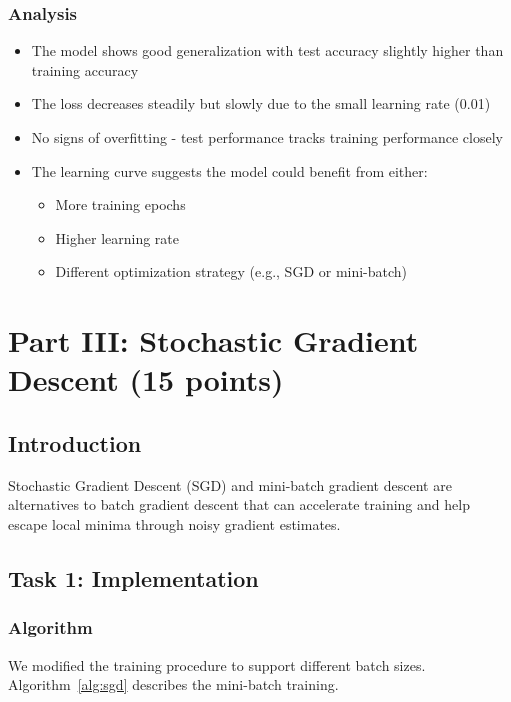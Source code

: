 \documentclass[11pt,a4paper]{article}
\begin{document}
\subsubsection{Analysis}
\begin{itemize}
    \item The model shows good generalization with test accuracy slightly higher than training accuracy
    \item The loss decreases steadily but slowly due to the small learning rate (0.01)
    \item No signs of overfitting - test performance tracks training performance closely
    \item The learning curve suggests the model could benefit from either:
    \begin{itemize}
        \item More training epochs
        \item Higher learning rate
        \item Different optimization strategy (e.g., SGD or mini-batch)
    \end{itemize}
\end{itemize}

\newpage
\section{Part III: Stochastic Gradient Descent (15 points)}

\subsection{Introduction}
Stochastic Gradient Descent (SGD) and mini-batch gradient descent are alternatives to batch gradient descent that can accelerate training and help escape local minima through noisy gradient estimates.

\subsection{Task 1: Implementation}

\subsubsection{Algorithm}
We modified the training procedure to support different batch sizes. Algorithm~\ref{alg:sgd} describes the mini-batch training.
\end{document}

